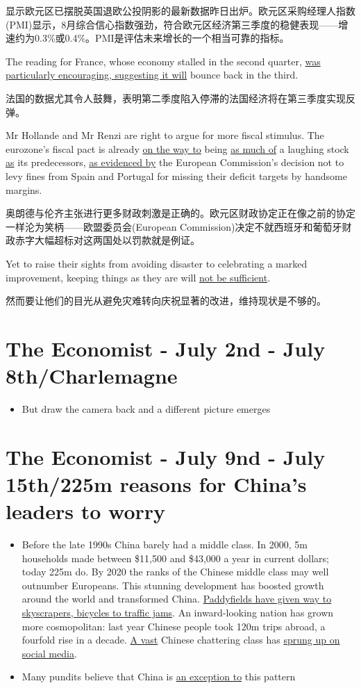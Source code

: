 \documentclass[UTF8]{ctexart}
\begin{document}
显示欧元区已摆脱英国退欧公投阴影的最新数据昨日出炉。欧元区采购经理人指数(PMI)显示，8月综合信心指数强劲，符合欧元区经济第三季度的稳健表现——增速约为0.3\%或0.4\%。PMI是评估未来增长的一个相当可靠的指标。

The reading for France, whose economy stalled in the second quarter, \underline{was particularly encouraging, suggesting it will} bounce back in the third.

法国的数据尤其令人鼓舞，表明第二季度陷入停滞的法国经济将在第三季度实现反弹。

Mr Hollande and Mr Renzi are right to argue for more fiscal stimulus. The eurozone’s fiscal pact is already \underline{on the way to} being \underline{as much of} a laughing stock \underline{as} its predecessors, \underline{as evidenced by} the European Commission’s decision not to levy fines from Spain and Portugal for missing their deficit targets by handsome margins.

奥朗德与伦齐主张进行更多财政刺激是正确的。欧元区财政协定正在像之前的协定一样沦为笑柄——欧盟委员会(European Commission)决定不就西班牙和葡萄牙财政赤字大幅超标对这两国处以罚款就是例证。

Yet to raise their sights from avoiding disaster to celebrating a marked improvement, keeping things as they are will \underline{not be sufficient}.

然而要让他们的目光从避免灾难转向庆祝显著的改进，维持现状是不够的。


\section{The Economist - July 2nd - July 8th/Charlemagne}
\begin{itemize}
\item But draw the camera back and a different picture emerges
\end{itemize}

\section{The Economist - July 9nd - July 15th/225m reasons for China's leaders to worry}
\begin{itemize}
\item Before the late 1990s China barely had a middle class. In 2000, 5m households made between \$11,500 and \$43,000 a year in current dollars; today 225m do. By 2020 the ranks of the Chinese middle class may well outnumber Europeans.
This stunning development has boosted growth around the world and transformed China. \underline{Paddyfields have given way to skyscrapers, bicycles to traffic jams}. An inward-looking nation has grown more cosmopolitan: last year Chinese people took 120m trips abroad, a fourfold rise in a decade. \underline{A vast} Chinese chattering class has \underline{sprung up on social media}.

\item Many pundits believe that China is \underline{an exception to} this pattern
\end{itemize}
\end{document}
